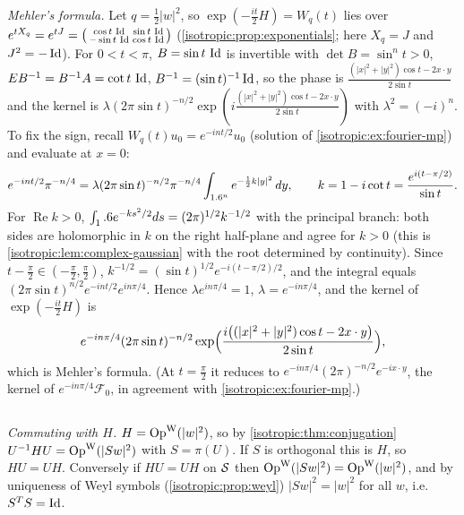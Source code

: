 \emph{Mehler's formula.} Let $q=\frac12|w|^2$, so $\exp(-\frac{it}2H)=W_q(t)$ lies
over $e^{tX_q}=e^{tJ}=\bigl(\begin{smallmatrix}\cos t\,\operatorname{Id}&\sin t\,\operatorname{Id}\\-\sin t\,\operatorname{Id}&\cos t\,\operatorname{Id}\end{smallmatrix}\bigr)$
(\cref{isotropic:prop:exponentials}; here $X_q=J$ and $J^2=-\operatorname{Id}$). For $0<t<\pi$, $B=\sin t\,\operatorname{Id}$ is invertible with
$\det B=\sin^nt>0$, $EB^{-1}=B^{-1}A=\cot t\,\operatorname{Id}$, $B^{-1}=(\sin t)^{-1}\operatorname{Id}$, so the
phase is $\frac{(|x|^2+|y|^2)\cos t-2x\cdot y}{2\sin t}$ and the kernel is
$\lambda(2\pi\sin t)^{-n/2}\exp(i\frac{(|x|^2+|y|^2)\cos t-2x\cdot y}{2\sin t})$ with
$\lambda^2=(-i)^n$. To fix the sign, recall $W_q(t)u_0=e^{-int/2}u_0$
(solution of \cref{isotropic:ex:fourier-mp}) and evaluate at $x=0$:
\begin{equation*}
  e^{-int/2}\pi^{-n/4}=\lambda(2\pi\sin t)^{-n/2}\pi^{-n/4}\int_{1.6^n}e^{-\frac12k|y|^2}\,dy,\qquad
  k=1-i\cot t=\frac{e^{i(t-\pi/2)}}{\sin t}.
\end{equation*}
For $\operatorname{Re}k>0$, $\int_1.6 e^{-ks^2/2}ds=(2\pi)^{1/2}k^{-1/2}$ with the
principal branch: both sides are holomorphic in $k$ on the right half-plane and
agree for $k>0$ (this is \cref{isotropic:lem:complex-gaussian} with the root
determined by continuity). Since $t-\frac\pi2\in(-\frac\pi2,\frac\pi2)$,
$k^{-1/2}=(\sin t)^{1/2}e^{-i(t-\pi/2)/2}$, and the integral equals
$(2\pi\sin t)^{n/2}e^{-int/2}e^{in\pi/4}$. Hence $\lambda e^{in\pi/4}=1$,
$\lambda=e^{-in\pi/4}$, and the kernel of $\exp(-\frac{it}2H)$ is
\begin{equation*}
  e^{-in\pi/4}(2\pi\sin t)^{-n/2}\exp\Bigl(\frac{i\bigl((|x|^2+|y|^2)\cos t-2x\cdot y\bigr)}{2\sin t}\Bigr),
\end{equation*}
which is Mehler's formula. (At $t=\frac\pi2$ it reduces to
$e^{-in\pi/4}(2\pi)^{-n/2}e^{-ix\cdot y}$, the kernel of $e^{-in\pi/4}\mathcal F_0$, in
agreement with \cref{isotropic:ex:fourier-mp}.)

\subsection*{}

\emph{Commuting with $H$.} $H=\operatorname{Op}^{\mathrm{W}}(|w|^2)$, so by \cref{isotropic:thm:conjugation}
$U^{-1}HU=\operatorname{Op}^{\mathrm{W}}(|Sw|^2)$ with $S=\pi(U)$. If $S$ is orthogonal this is $H$, so
$HU=UH$. Conversely if $HU=UH$ on $\mathcal{S}$ then $\operatorname{Op}^{\mathrm{W}}(|Sw|^2)=\operatorname{Op}^{\mathrm{W}}(|w|^2)$, and by
uniqueness of Weyl symbols (\cref{isotropic:prop:weyl}) $|Sw|^2=|w|^2$ for all
$w$, i.e.\ $S^TS=\operatorname{Id}$.

